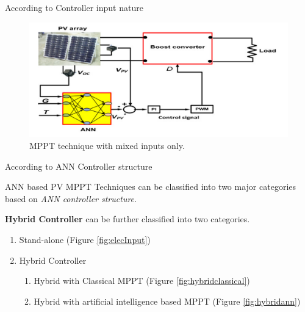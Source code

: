\documentclass[10pt]{beamer}
\begin{document}
\begin{frame}[c, allowframebreaks]{According to Controller input nature}
\framebreak 

\begin{figure}
	\centerline{\includegraphics[scale=0.2]{mixedinput.png}}
    \caption{MPPT technique with mixed inputs only.}
    \label{fig:mixedInput}
\end{figure}
\end{frame}


\begin{frame}[c]{According to ANN Controller structure}

ANN based PV MPPT Techniques can be classified into two major categories based on \textit{ANN controller structure}. 

\textbf{Hybrid Controller} can be further classified into two categories.

\begin{enumerate}
	\item{Stand-alone (Figure \ref{fig:elecInput})}
    \item{Hybrid Controller
    	\begin{enumerate}
        	\item{Hybrid with Classical MPPT (Figure \ref{fig:hybridclassical})}
            \item{Hybrid with artificial intelligence based MPPT (Figure \ref{fig:hybridann})}
        \end{enumerate}
    }
\end{enumerate}

\end{frame}
\end{document}
